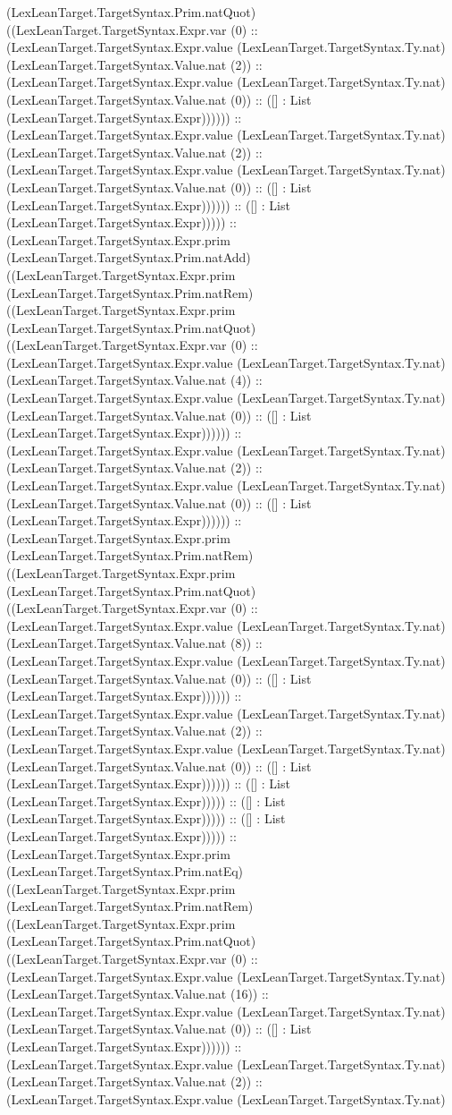 \documentclass[11pt]{article}
\begin{document}
(LexLeanTarget.TargetSyntax.Prim.natQuot) ((LexLeanTarget.TargetSyntax.Expr.var (0) :: (LexLeanTarget.TargetSyntax.Expr.value (LexLeanTarget.TargetSyntax.Ty.nat) (LexLeanTarget.TargetSyntax.Value.nat (2)) :: (LexLeanTarget.TargetSyntax.Expr.value (LexLeanTarget.TargetSyntax.Ty.nat) (LexLeanTarget.TargetSyntax.Value.nat (0)) :: ([] : List (LexLeanTarget.TargetSyntax.Expr)))))) :: (LexLeanTarget.TargetSyntax.Expr.value (LexLeanTarget.TargetSyntax.Ty.nat) (LexLeanTarget.TargetSyntax.Value.nat (2)) :: (LexLeanTarget.TargetSyntax.Expr.value (LexLeanTarget.TargetSyntax.Ty.nat) (LexLeanTarget.TargetSyntax.Value.nat (0)) :: ([] : List (LexLeanTarget.TargetSyntax.Expr)))))) :: ([] : List (LexLeanTarget.TargetSyntax.Expr))))) :: (LexLeanTarget.TargetSyntax.Expr.prim (LexLeanTarget.TargetSyntax.Prim.natAdd) ((LexLeanTarget.TargetSyntax.Expr.prim (LexLeanTarget.TargetSyntax.Prim.natRem) ((LexLeanTarget.TargetSyntax.Expr.prim (LexLeanTarget.TargetSyntax.Prim.natQuot) ((LexLeanTarget.TargetSyntax.Expr.var (0) :: (LexLeanTarget.TargetSyntax.Expr.value (LexLeanTarget.TargetSyntax.Ty.nat) (LexLeanTarget.TargetSyntax.Value.nat (4)) :: (LexLeanTarget.TargetSyntax.Expr.value (LexLeanTarget.TargetSyntax.Ty.nat) (LexLeanTarget.TargetSyntax.Value.nat (0)) :: ([] : List (LexLeanTarget.TargetSyntax.Expr)))))) :: (LexLeanTarget.TargetSyntax.Expr.value (LexLeanTarget.TargetSyntax.Ty.nat) (LexLeanTarget.TargetSyntax.Value.nat (2)) :: (LexLeanTarget.TargetSyntax.Expr.value (LexLeanTarget.TargetSyntax.Ty.nat) (LexLeanTarget.TargetSyntax.Value.nat (0)) :: ([] : List (LexLeanTarget.TargetSyntax.Expr)))))) :: (LexLeanTarget.TargetSyntax.Expr.prim (LexLeanTarget.TargetSyntax.Prim.natRem) ((LexLeanTarget.TargetSyntax.Expr.prim (LexLeanTarget.TargetSyntax.Prim.natQuot) ((LexLeanTarget.TargetSyntax.Expr.var (0) :: (LexLeanTarget.TargetSyntax.Expr.value (LexLeanTarget.TargetSyntax.Ty.nat) (LexLeanTarget.TargetSyntax.Value.nat (8)) :: (LexLeanTarget.TargetSyntax.Expr.value (LexLeanTarget.TargetSyntax.Ty.nat) (LexLeanTarget.TargetSyntax.Value.nat (0)) :: ([] : List (LexLeanTarget.TargetSyntax.Expr)))))) :: (LexLeanTarget.TargetSyntax.Expr.value (LexLeanTarget.TargetSyntax.Ty.nat) (LexLeanTarget.TargetSyntax.Value.nat (2)) :: (LexLeanTarget.TargetSyntax.Expr.value (LexLeanTarget.TargetSyntax.Ty.nat) (LexLeanTarget.TargetSyntax.Value.nat (0)) :: ([] : List (LexLeanTarget.TargetSyntax.Expr)))))) :: ([] : List (LexLeanTarget.TargetSyntax.Expr))))) :: ([] : List (LexLeanTarget.TargetSyntax.Expr))))) :: ([] : List (LexLeanTarget.TargetSyntax.Expr))))) :: (LexLeanTarget.TargetSyntax.Expr.prim (LexLeanTarget.TargetSyntax.Prim.natEq) ((LexLeanTarget.TargetSyntax.Expr.prim (LexLeanTarget.TargetSyntax.Prim.natRem) ((LexLeanTarget.TargetSyntax.Expr.prim (LexLeanTarget.TargetSyntax.Prim.natQuot) ((LexLeanTarget.TargetSyntax.Expr.var (0) :: (LexLeanTarget.TargetSyntax.Expr.value (LexLeanTarget.TargetSyntax.Ty.nat) (LexLeanTarget.TargetSyntax.Value.nat (16)) :: (LexLeanTarget.TargetSyntax.Expr.value (LexLeanTarget.TargetSyntax.Ty.nat) (LexLeanTarget.TargetSyntax.Value.nat (0)) :: ([] : List (LexLeanTarget.TargetSyntax.Expr)))))) :: (LexLeanTarget.TargetSyntax.Expr.value (LexLeanTarget.TargetSyntax.Ty.nat) (LexLeanTarget.TargetSyntax.Value.nat (2)) :: (LexLeanTarget.TargetSyntax.Expr.value (LexLeanTarget.TargetSyntax.Ty.nat) 
\end{document}
